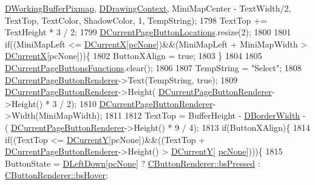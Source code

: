 \begin{DoxyCode}
      \hyperlink{classCApplicationData_afa34cf2780f38dd28c0c811e69d60a97}{DWorkingBufferPixmap}, \hyperlink{classCApplicationData_aa6c5bea9bdcc64398e5a3f693661d37c}{DDrawingContext}, MiniMapCenter - TextWidth/2, 
      TextTop, TextColor, ShadowColor, 1, TempString);
1798     TextTop += TextHeight * 3 / 2;
1799     \hyperlink{classCApplicationData_a3615df8e23cea3ce17f11cf61340a7b4}{DCurrentPageButtonLocations}.resize(2);
1800     
1801     \textcolor{keywordflow}{if}((MiniMapLeft <= \hyperlink{classCApplicationData_a1dc7ee482a39f7978c71365ac540f97a}{DCurrentX}[\hyperlink{GameDataTypes_8h_aafb0ca75933357ff28a6d7efbdd7602fa88767aa8e02c7b3192bbab4127b3d729}{pcNone}])&&(MiniMapLeft + MiniMapWidth > 
      \hyperlink{classCApplicationData_a1dc7ee482a39f7978c71365ac540f97a}{DCurrentX}[pcNone]))\{
1802         ButtonXAlign = \textcolor{keyword}{true};
1803     \}
1804     
1805     \hyperlink{classCApplicationData_ad3079e5563a19d21c1e4ceff2a188382}{DCurrentPageButtonsFunctions}.clear();
1806     
1807     TempString = \textcolor{stringliteral}{"Select"};
1808     \hyperlink{classCApplicationData_abfe1743f2634b069ccc811db4a8733a8}{DCurrentPageButtonRenderer}->Text(TempString, \textcolor{keyword}{true});   
1809     \hyperlink{classCApplicationData_abfe1743f2634b069ccc811db4a8733a8}{DCurrentPageButtonRenderer}->Height(
      \hyperlink{classCApplicationData_abfe1743f2634b069ccc811db4a8733a8}{DCurrentPageButtonRenderer}->Height() * 3 / 2);
1810     \hyperlink{classCApplicationData_abfe1743f2634b069ccc811db4a8733a8}{DCurrentPageButtonRenderer}->Width(MiniMapWidth);
1811     
1812     TextTop = BufferHeight - \hyperlink{classCApplicationData_a566b69c72fa982c6ecf8e47dc21df489}{DBorderWidth} - (
      \hyperlink{classCApplicationData_abfe1743f2634b069ccc811db4a8733a8}{DCurrentPageButtonRenderer}->Height() * 9 / 4);
1813     \textcolor{keywordflow}{if}(ButtonXAlign)\{
1814         \textcolor{keywordflow}{if}((TextTop <= \hyperlink{classCApplicationData_a0ba39779ae11c8072258c6ddfebd6052}{DCurrentY}[pcNone])&&((TextTop + 
      \hyperlink{classCApplicationData_abfe1743f2634b069ccc811db4a8733a8}{DCurrentPageButtonRenderer}->Height() > \hyperlink{classCApplicationData_a0ba39779ae11c8072258c6ddfebd6052}{DCurrentY}[
      \hyperlink{GameDataTypes_8h_aafb0ca75933357ff28a6d7efbdd7602fa88767aa8e02c7b3192bbab4127b3d729}{pcNone}])))\{
1815             ButtonState = \hyperlink{classCApplicationData_a2b943f18557c3e4c8cd4550e22e028b6}{DLeftDown}[\hyperlink{GameDataTypes_8h_aafb0ca75933357ff28a6d7efbdd7602fa88767aa8e02c7b3192bbab4127b3d729}{pcNone}] ? 
      \hyperlink{classCButtonRenderer_ae0eccda184600f6e14bfd59033e5e9a1a8fad69630f3700a97a0c51bcbb4441b5}{CButtonRenderer::bsPressed} : \hyperlink{classCButtonRenderer_ae0eccda184600f6e14bfd59033e5e9a1ad6758a415bde0eee152a0e2f7d07e3b6}{CButtonRenderer::bsHover};

\end{DoxyCode}
